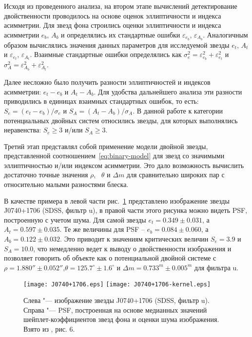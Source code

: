 Исходя из проведенного анализа, на втором этапе вычислений детектирование двойственности проводилось на основе оценок эллиптичности и индекса асимметрии. Для звезд фона строились оценки эллиптичности и индекса асимметрии $e_{b}$, $A_{b}$ и определялись их стандартные ошибки $\varepsilon_{e_{b}}$, $\varepsilon_{A_{b}}$. Аналогичным образом вычислялись значения данных параметров для исследуемой звезды $e_{t}$, $A_{t}$ и $\varepsilon_{e_{t}}$, $\varepsilon_{A_{t}}$. Взаимные стандартные ошибки определялись как $\sigma_e^2 = \varepsilon_{e_{b}}^2+\varepsilon_{e_{t}}^2$ и $\sigma_A^2 = \varepsilon_{A_{b}}^2+\varepsilon_{A_{t}}^2$.

Далее несложно было получить разности эллиптичностей и индексов асимметрии: $e_{t} - e_{b}$ и $A_{t} - A_{b}$. Для удобства дальнейшего анализа эти разности приводились в единицах взаимных стандартных ошибок, то есть:  $S_e = (e_{t} - e_{b})/\sigma_e$ и $S_A =(A_{t} - A_{b})/\sigma_A$. В данной работе к категории потенциальных двойных систем относились звезды, для которых выполнялись неравенства: $S_e\geq3$ и/или $S_A\geq3$.

Третий этап представлял собой применение модели двойной звезды, представленной соотношением~\ref{eq:binary-model} для звезд со значимыми эллиптичностью и/или индексом асимметрии. Это дало возможность вычислить достаточно точные значения $\rho$,  ~$\theta$ и $\Delta m$ для сравнительно широких пар с относительно малыми разностями блеска.

В качестве примера в левой части рис.~\ref{fig:J0740+1706} представлено изображение звезды J0740+1706  (SDSS, фильтр u), в правой части этого рисунка можно видеть PSF, построенную с учетом шума. Для самой звезды $e_{t} =0.349\pm0.031$, а   $A_{t} = 0.597\pm0.035$. Те же величины для PSF -- $e_{b} =0.084\pm0.060$, а   $A_{b} =0.122\pm0.032$. Это приводит к значениям критических величин $S_e = 3.9$ и $S_A = 10.0$, что немедленно ведет к выводу о двойственности изображения и позволяет говорить об объекте как о потенциальной двойной системе с $\rho = 1.880''\pm0.052''$,$\theta=125.7^\circ\pm1.6^\circ$ и $\Delta m= 0.733^m\pm0.005^m$ для фильтра u.

\begin{figure}[h]
\centering
\texttt{[image: J0740+1706.eps]}
\texttt{[image: J0740+1706-kernel.eps]}
\caption{Слева "--- изображение звезды J0740+1706  (SDSS, фильтр u). Справа "--- PSF, построенная на основе медианных значений шейплет-коэффициентов звезд фона и оценки шума изображения. Взято из \cite{2018AstL...44..103K}, рис. 6.}
\label{fig:J0740+1706}
\end{figure}

